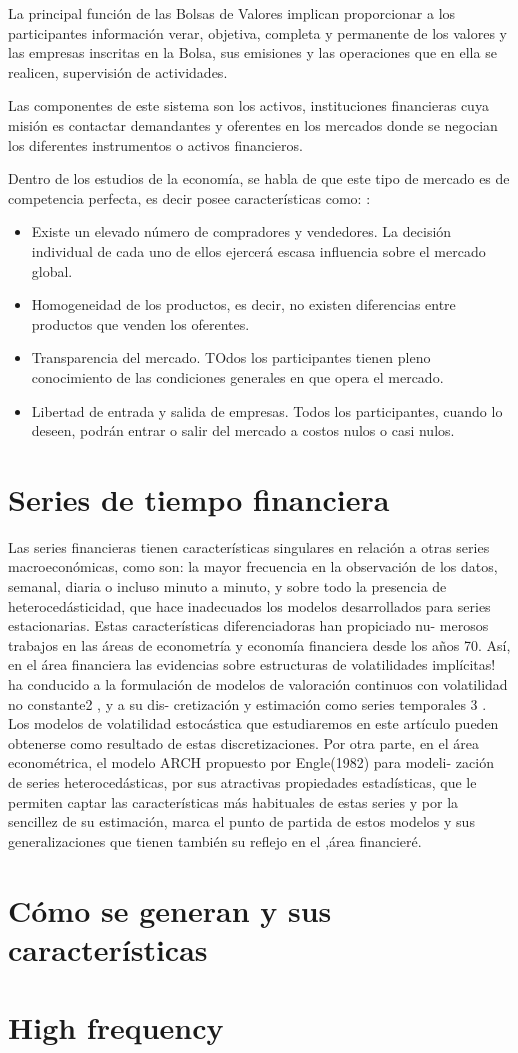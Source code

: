 La principal función de las Bolsas de Valores implican proporcionar a los participantes información verar, objetiva, completa y permanente de los valores
y las empresas inscritas en la Bolsa, sus emisiones y las operaciones que en ella se realicen, supervisión de actividades.

Las componentes de este sistema son los activos, instituciones financieras cuya misión es contactar demandantes y oferentes en los mercados donde se negocian
los diferentes instrumentos o activos financieros.

Dentro de los estudios de la economía, se habla de que este tipo de mercado es de competencia perfecta, es decir posee características
como: \cite{mankiw2011principles}:
\begin{itemize}
        \item Existe un elevado número de compradores y vendedores. La decisión individual de cada uno de ellos ejercerá escasa influencia sobre el mercado global.
        \item Homogeneidad de los productos, es decir, no existen diferencias entre productos que venden los oferentes.
        \item Transparencia del mercado. TOdos los participantes tienen pleno conocimiento de las condiciones generales en que opera el mercado.
        \item Libertad de entrada y salida de empresas. Todos los participantes, cuando lo deseen, podrán entrar o salir del mercado a costos nulos o casi nulos.
\end{itemize}

\section{Series de tiempo financiera}

Las series financieras tienen características singulares en relación a otras series macroeconómicas,
como son: la mayor frecuencia en la observación de los datos, semanal, diaria o incluso minuto
a minuto, y sobre todo la presencia de heterocedásticidad, que hace inadecuados los modelos
desarrollados para series estacionarias. Estas características diferenciadoras han propiciado nu-
merosos trabajos en las áreas de econometría y economía financiera desde los años 70. Así, en
el área financiera las evidencias sobre estructuras de volatilidades implícitas! ha conducido a
la formulación de modelos de valoración continuos con volatilidad no constante2 , y a su dis-
cretización y estimación como series temporales 3 . Los modelos de volatilidad estocástica que
estudiaremos en este artículo pueden obtenerse como resultado de estas discretizaciones. Por
otra parte, en el área econométrica, el modelo ARCH propuesto por Engle(1982) para modeli-
zación de series heterocedásticas, por sus atractivas propiedades estadísticas, que le permiten
captar las características más habituales de estas series y por la sencillez de su estimación, marca
el punto de partida de estos modelos y sus generalizaciones que tienen también su reflejo en el
,área financieré.


\section{Cómo se generan y sus características}
\section{High frequency}
